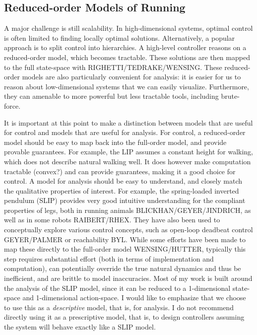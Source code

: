 \subsection{Reduced-order Models of Running}

A major challenge is still scalability. In high-dimensional systems, optimal control is often limited to finding locally optimal solutions. Alternatively, a popular approach is to split control into hierarchies. A high-level controller reasons on a reduced-order model, which becomes tractable. These solutions are then mapped to the full state-space with RIGHETTI/TEDRAKE/WENSING. These reduced-order models are also particularly convenient for analysis: it is easier for us to reason about low-dimensional systems that we can easily visualize. Furthermore, they can amenable to more powerful but less tractable tools, including brute-force. \par

It is important at this point to make a distinction between models that are useful for control and models that are useful for analysis. For control, a reduced-order model should be easy to map back into the full-order model, and provide provable guarantees. For example, the LIP assumes a constant height for walking, which does not describe natural walking well. It does however make computation tractable (convex?) and can provide guarantees, making it a good choice for control. A model for analysis should be easy to understand, and closely match the qualitative properties of interest. For example, the spring-loaded inverted pendulum (SLIP) provides very good intuitive understanding for the compliant properties of legs, both in running animals BLICKHAN/GEYER/JINDRICH, as well as in some robots RAIBERT/RHEX. They have also been used to conceptually explore various control concepts, such as open-loop deadbeat control GEYER/PALMER or reachability BYL. While some efforts have been made to map these directly to the full-order model WENSING/HUTTER, typically this step requires substantial effort (both in terms of implementation and computation), can potentially override the true natural dynamics and thus be inefficient, and are brittle to model inaccuracies. Most of my work is built around the analysis of the SLIP model, since it can be reduced to a 1-dimensional state-space and 1-dimensional action-space. I would like to emphasize that we choose to use this as a \emph{descriptive} model, that is, for analysis. I do not recommend directly using it as a prescriptive model, that is, to design controllers assuming the system will behave exactly like a SLIP model.

